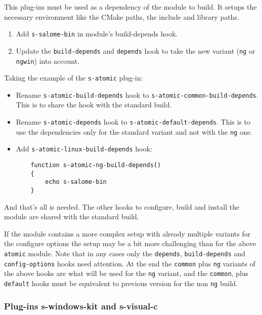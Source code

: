 \documentclass[a4paper,12pt,twoside]{article}
\newcommand{\code}[1]{\texttt{#1}}
\begin{document}
This plug-ins must be used as a dependency of the module to build. It setups the necessary environment like the CMake paths, the include and library paths.

\begin{enumerate}
	\item Add \code{s-salome-bin} in module's build-depends hook.
	\item Update the \code{build-depends} and \code{depends} hook to take the new variant (\code{ng} or \code{ngwin}) into account.
\end{enumerate}

Taking the example of the \code{s-atomic} plug-in:

\begin{itemize}
	\item Rename \code{s-atomic-build-depends} hook to \code{s-atomic-common-build-depends}. This is to share the hook with the standard build.

	\item Rename \code{s-atomic-depends} hook to \code{s-atomic-default-depends}. This is to use the dependencies only for the standard variant and not with the \code{ng} one.

	\item Add \code{s-atomic-linux-build-depends} hook:
	\begin{lstlisting}
	function s-atomic-ng-build-depends()
	{
		echo s-salome-bin
	}
	\end{lstlisting}
\end{itemize}

And that's all is needed. The other hooks to configure, build and install the module are shared with the standard build.

If the module contains a more complex setup with already multiple variants for the configure options the setup may be a bit more challenging than for the above \code{atomic} module. Note that in any cases only the \code{depends}, \code{build-depends} and \code{config-options} hooks need attention. At the end the \code{common} plus \code{ng} variants of the above hooks are what will be used for the \code{ng} variant, and the \code{common}, plus \code{default} hooks must be equivalent to previous version for the non \code{ng} build.

\subsubsection{Plug-ins s-windows-kit and s-visual-c}
\label{pg:win}
\end{document}
